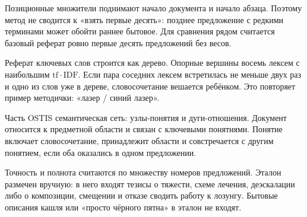 Позиционные множители поднимают начало документа и начало абзаца. Поэтому метод не сводится к «взять первые десять»: позднее предложение с редкими терминами может обойти раннее бытовое. Для сравнения рядом считается базовый реферат \mdash ровно первые десять предложений без весов.

Реферат ключевых слов строится как дерево. Опорные вершины \mdash восемь лексем с наибольшим $\mathrm{tf}\cdot\mathrm{IDF}$. Если пара соседних лексем встретилась не меньше двух раз и одно из слов уже в дереве, словосочетание вешается ребёнком. Это повторяет пример методички: «лазер / синий лазер».

Часть OSTIS \mdash семантическая сеть: узлы-понятия и дуги-отношения. Документ относится к предметной области и связан с ключевыми понятиями. Понятие включает словосочетание, принадлежит области и совстречается с другим понятием, если оба оказались в одном предложении.

Точность и полнота считаются по множеству номеров предложений. Эталон размечен вручную: в него входят тезисы о тяжести, схеме лечения, деэскалации либо о композиции, смещении и отказе сводить работу к лозунгу. Бытовые описания кашля или «просто чёрного пятна» в эталон не входят.
